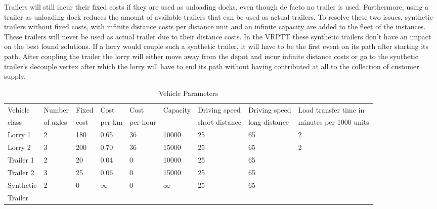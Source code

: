  Trailers will still incur their fixed costs if they are used as unloading docks, even though de facto no trailer is used. Furthermore, using a trailer as unloading dock reduces the amount of available trailers that can be used as actual trailers.
 To resolve these two issues, synthetic trailers without fixed costs, with infinite distance costs per distance unit and an infinite capacity are added to the fleet of the instances.
These trailers will never be used as actual trailer due to their distance costs.
In the VRPTT these synthetic trailers don't have an impact on the best found solutions.
If a lorry would couple such a synthetic trailer, it will have to be the first event on its path after starting its path.
After coupling the trailer the lorry will either move away from the depot and incur infinite distance costs or go to the synthetic trailer's decouple vertex after which the lorry will have to end its path without having contributed at all to the collection of customer supply. \\




\begin{table}[h]
\caption{Vehicle Parameters}
\label{tab:vehpar}
\hspace*{-3.5cm}\begin{tabular}{lllllllll}
\toprule
Vehicle  & Number  & Fixed  &  Cost  &  Cost  &  Capacity &  Driving speed & Driving speed  & Load transfer time in  \\
 class & of axles & cost &   per km &   per hour &   &  short distance & long distance & minutes per 1000 units \\
 \midrule
Lorry 1 &2 &180 &0.65 &36 &10000& 25 &65 &2 \\
Lorry 2 &3 &200& 0.70& 36& 15000& 25 &65 &2\\
Trailer 1 &2& 20& 0.04& 0 &10000 &25 &65 &\\
Trailer 2 &3 &25 &0.06 &0 &15000& 25& 65 &\\
Synthetic & 2 & 0 & $\infty$ & 0 & $\infty$ & 25 & 65 & \\
Trailer & & & & &&& &\\
\bottomrule
\end{tabular}
\end{table}




